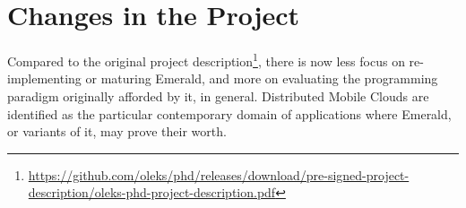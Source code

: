 \section{Changes in the Project}

Compared to the original project
description\footnote{\url{https://github.com/oleks/phd/releases/download/pre-signed-project-description/oleks-phd-project-description.pdf}},
there is now less focus on re-implementing or maturing Emerald, and
more on evaluating the programming paradigm originally afforded by it,
in general. Distributed Mobile Clouds are identified as the particular
contemporary domain of applications where Emerald, or variants of it,
may prove their worth.
